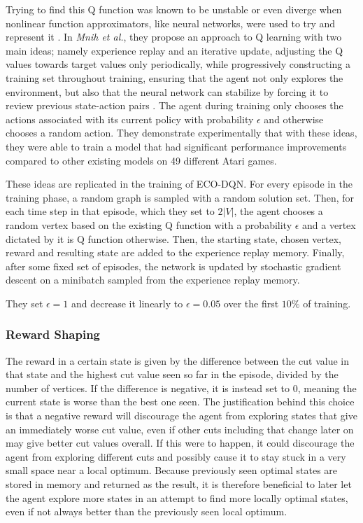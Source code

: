 \documentclass{article}
\begin{document}
Trying to find this Q function was known to be unstable or even diverge when nonlinear function approximators, like neural networks, were used to try and represent it \cite{td-func-approx}. In \textit{Mnih et al.}, they propose an approach to Q learning with two main ideas; namely experience replay and an iterative update, adjusting the Q values towards target values only periodically, while progressively constructing a training set throughout training, ensuring that the agent not only explores the environment, but also that the neural network can stabilize by forcing it to review previous state-action pairs \cite{deepmind_2015}. The agent during training only chooses the actions associated with its current policy with probability $\epsilon$ and otherwise chooses a random action. They demonstrate experimentally that with these ideas, they were able to train a model that had significant performance improvements compared to other existing models on 49 different Atari games.

These ideas are replicated in the training of ECO-DQN. For every episode in the training phase, a random graph is sampled with a random solution set. Then, for each time step in that episode, which they set to $2|V|$, the agent chooses a random vertex based on the existing Q function with a probability $\epsilon$ and a vertex dictated by it is Q function otherwise. Then, the starting state, chosen vertex, reward and resulting state are added to the experience replay memory. Finally, after some fixed set of episodes, the network is updated by stochastic gradient descent on a minibatch sampled from the experience replay memory.

They set $\epsilon = 1$ and decrease it linearly to $\epsilon=0.05$ over the first $10\%$ of training. 

\subsubsection{Reward Shaping}

The reward in a certain state is given by the difference between the cut value in that state and the highest cut value seen so far in the episode, divided by the number of vertices. If the difference is negative, it is instead set to 0, meaning the current state is worse than the best one seen. The justification behind this choice is that a negative reward will discourage the agent from exploring states that give an immediately worse cut value, even if other cuts including that change later on may give better cut values overall. If this were to happen, it could discourage the agent from exploring different cuts and possibly cause it to stay stuck in a very small space near a local optimum. Because previously seen optimal states are stored in memory and returned as the result, it is therefore beneficial to later let the agent explore more states in an attempt to find more locally optimal states, even if not always better than the previously seen local optimum.
\end{document}
